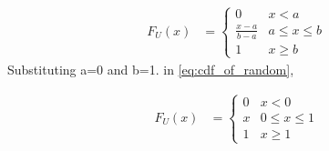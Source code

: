 \documentclass[12pt]{book}
\begin{document}
\begin{enumerate}
\begin{align}
F_{U}(x) &= 
\begin{cases}
0 & x < a \\
\frac{x-a}{b-a} & a \leq x \leq b \\
1 & x \geq b
\end{cases}
\label{eq:cdf_of_random}
\end{align}
Substituting  a=0 and b=1. in \eqref{eq:cdf_of_random},
   
\begin{align}
F_{U}(x) &= 
\begin{cases}
0 & x < 0 \\
x& 0 \leq x \leq 1 \\
1 & x \geq 1
\end{cases}
\label{eq:uni_cdf}
\end{align}


\end{enumerate}
\end{document}
